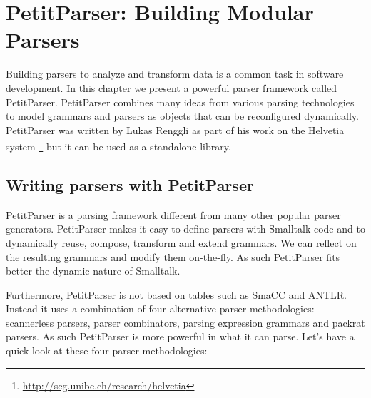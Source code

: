 \documentclass[a4paper,10pt,twoside]{book}
\begin{document}
\fi
\sloppy
\chapter{PetitParser: Building Modular Parsers}

\chapterauthor{\authorjankurs{} \\ \authorguillaume{} \\ \authorlukas{}}

\newcommand{\ppmthind}[1]{\clsmthind{PPParser}{#1}}

Building parsers to analyze and transform data is a common task in
software development. In this chapter we present a powerful parser
framework called PetitParser. PetitParser combines many ideas from
various parsing technologies to model grammars and parsers as objects
that can be reconfigured dynamically. PetitParser was written by Lukas
Renggli as part of his work on the Helvetia system \footnote{\url{http://scg.unibe.ch/research/helvetia}} but it can be used
as a standalone library.

\section{Writing parsers with PetitParser}

PetitParser is a parsing framework different from many other popular
parser generators. PetitParser makes it easy to define parsers with
Smalltalk code and to dynamically reuse, compose, transform and extend
grammars. We can reflect on the resulting grammars and modify them
on-the-fly. As such PetitParser fits better the dynamic nature of
Smalltalk.

Furthermore, PetitParser is not based on tables such as SmaCC and
ANTLR. Instead it uses a combination of four alternative parser
methodologies: scannerless parsers, parser combinators, parsing
expression grammars and packrat parsers. As such PetitParser is more
powerful in what it can parse. Let's have a quick look at these four
parser methodologies:
\end{document}
